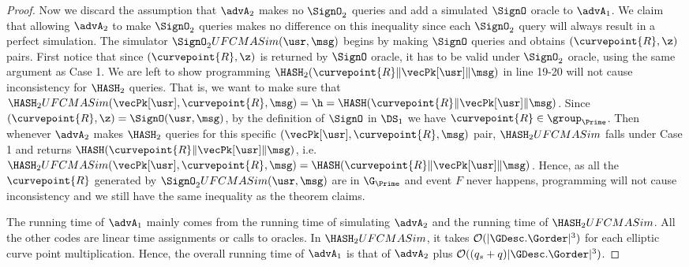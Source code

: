 \begin{proof}
		Now we discard the assumption that $\advA_2$ makes no $\SignO_2$ queries and add a simulated $\SignO$ oracle to $\advA_1$. We claim that allowing $\advA_2$ to make $\SignO_2$ queries makes no difference on this inequality since each $\SignO_2$ query will always result in a perfect simulation. The simulator $\SignO_2 UFCMASim(\usr, \msg)$ begins by making $\SignO$ queries and obtains $(\curvepoint{R}, \z)$ pairs. First notice that since $(\curvepoint{R}, \z)$ is returned by $\SignO$ oracle, it has to be valid under $\SignO_2$ oracle, using the same argument as Case 1. We are left to show programming $\HASH_2(\curvepoint{R}\|\vecPk[\usr]\| \msg)$ in line 19-20 will not cause inconsistency for $\HASH_2$ queries. That is, we want to make sure that $\HASH_2UFCMASim(\vecPk[\usr], \curvepoint{R},  \msg) = \h = \HASH(\curvepoint{R}\|\vecPk[\usr]\| \msg)$. Since $(\curvepoint{R}, \z) = \SignO(\usr, \msg)$, by the definition of $\SignO$ in $\DS_1$ we have $\curvepoint{R} \in \group_{\Prime}$. Then whenever $\advA_2$ makes $\HASH_2$ queries for this specific $(\vecPk[\usr], \curvepoint{R}, \msg)$ pair, $\HASH_2UFCMASim$ falls under Case 1 and returns $\HASH(\curvepoint{R}\|\vecPk[\usr]\| \msg)$, i.e. $\HASH_2UFCMASim(\vecPk[\usr], \curvepoint{R},  \msg) = \HASH(\curvepoint{R}\|\vecPk[\usr]\| \msg)$. Hence, as all the $\curvepoint{R}$ generated by $\SignO_2 UFCMASim(\usr, \msg)$ are in $\G_\Prime$ and event $F$ never happens, programming will not cause inconsistency and we still have the same inequality as the theorem claims.
		
		The running time of $\advA_1$ mainly comes from the running time of simulating $\advA_2$ and the running time of $\HASH_2UFCMASim$. All the other codes are linear time assignments or calls to oracles. In $\HASH_2UFCMASim$, it takes $\mathcal{O}(|\GDesc.\Gorder|^3)$ for each elliptic curve point multiplication. Hence, the overall running time of $\advA_1$ is that of $\advA_2$ plus $\mathcal{O}((q_s + q)|\GDesc.\Gorder|^3)$.
	\end{proof}
	
